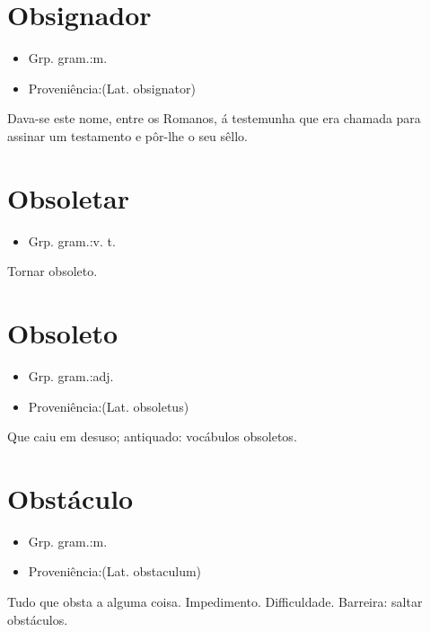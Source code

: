 \section{Obsignador}
\begin{itemize}
\item {Grp. gram.:m.}
\end{itemize}
\begin{itemize}
\item {Proveniência:(Lat. \textunderscore obsignator\textunderscore )}
\end{itemize}
Dava-se este nome, entre os Romanos, á testemunha que era chamada para assinar um testamento e pôr-lhe o seu sêllo.
\section{Obsoletar}
\begin{itemize}
\item {Grp. gram.:v. t.}
\end{itemize}
Tornar obsoleto.
\section{Obsoleto}
\begin{itemize}
\item {Grp. gram.:adj.}
\end{itemize}
\begin{itemize}
\item {Proveniência:(Lat. \textunderscore obsoletus\textunderscore )}
\end{itemize}
Que caiu em desuso; antiquado: \textunderscore vocábulos obsoletos\textunderscore .
\section{Obstáculo}
\begin{itemize}
\item {Grp. gram.:m.}
\end{itemize}
\begin{itemize}
\item {Proveniência:(Lat. \textunderscore obstaculum\textunderscore )}
\end{itemize}
Tudo que obsta a alguma coisa.
Impedimento.
Difficuldade.
Barreira: \textunderscore saltar obstáculos\textunderscore .
